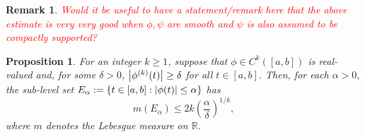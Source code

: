 \documentclass[11pt]{article}
\newtheorem{proposition}[theorem]{Proposition}
\newtheorem{remark}{Remark}
\newcommand{\lp}{\left(}
\newcommand{\rp}{\right)}
\newcommand{\f}[2]{\frac{#1}{#2}}
\newcommand{\al}{\alpha}
\begin{document}
\begin{remark}
\textcolor{red}{Would it be useful to have a statement/remark here that the above estimate is very very good when $\phi,\psi$ are smooth and $\psi$ is also assumed to be compactly supported?}
\end{remark}

\begin{proposition}\label{prop:SublevelSetEstimate} 
For an integer $k\geq 1$, suppose that $\phi\in C^k([a,b])$ is real-valued and, for some $\delta>0$, $\abs{\phi^{(k)}(t)} \geq \delta$ for all $t \in [a,b]$. Then, for each $\alpha>0$, the sub-level set $E_\al := \{ t \in[a,b] : \abs{\phi(t)} \leq \al \}$ has
\begin{equation*}
    m(E_\al) \leq 2 k \lp \f{\al}{\delta} \rp^{1/k},
\end{equation*}
where $m$ denotes the Lebesgue measure on $\mathbb{R}$.
\end{proposition}
\end{document}
